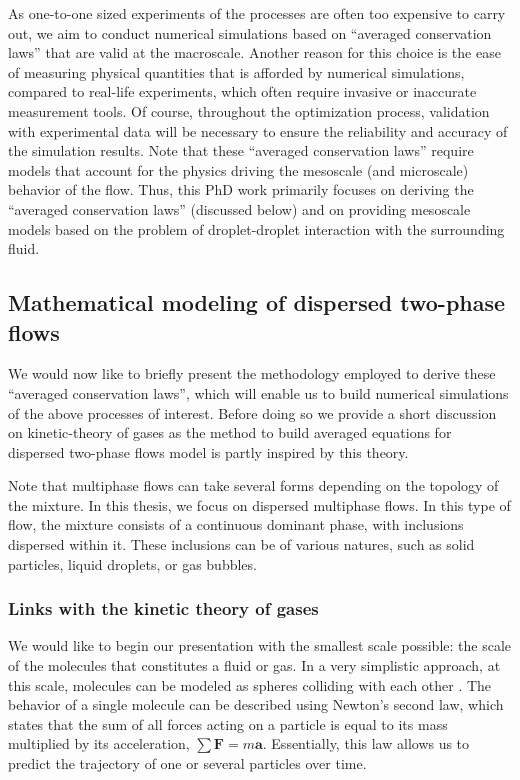 As one-to-one sized experiments of the processes are often too expensive to carry out, we aim to conduct numerical simulations based on ``averaged conservation laws'' that are valid at the macroscale. 
Another reason for this choice is the ease of measuring physical quantities that is afforded by numerical simulations, compared to real-life experiments, which often require invasive or inaccurate measurement tools.
Of course, throughout the optimization process, validation with experimental data will be necessary to ensure the reliability and accuracy of the simulation results. 
Note that these ``averaged conservation laws'' require models that account for the physics driving the mesoscale (and microscale) behavior of the flow. 
Thus, this PhD work primarily focuses on deriving the ``averaged conservation laws'' (discussed below) and on providing mesoscale models based on the problem of droplet-droplet interaction with the surrounding fluid.

\subsection{Mathematical modeling of dispersed two-phase flows }

We would now like to briefly present the methodology employed to derive these ``averaged conservation laws'', which will enable us to build numerical simulations of the above processes of interest.
Before doing so we provide a short discussion on kinetic-theory of gases as the method to build averaged equations for dispersed two-phase flows model is partly inspired by this theory. 

Note that multiphase flows can take several forms depending on the topology of the mixture. In this thesis, we focus on dispersed multiphase flows.
In this type of flow, the mixture consists of a continuous dominant phase, with inclusions dispersed within it. These inclusions can be of various natures, such as solid particles, liquid droplets, or gas bubbles.

\subsubsection{Links with the kinetic theory of gases}

We would like to begin our presentation with the smallest scale possible: the scale of the molecules that constitutes a fluid or gas.
In a very simplistic approach, at this scale, molecules can be modeled as spheres colliding with each other \citep{kardar2007statistical}. 
The behavior of a single molecule can be described using Newton's second law, which states that the sum of all forces acting on a particle is equal to its mass multiplied by its acceleration, $\sum\textbf{F} = m \textbf{a}$. 
Essentially, this law allows us to predict the trajectory of one or several particles over time. 


